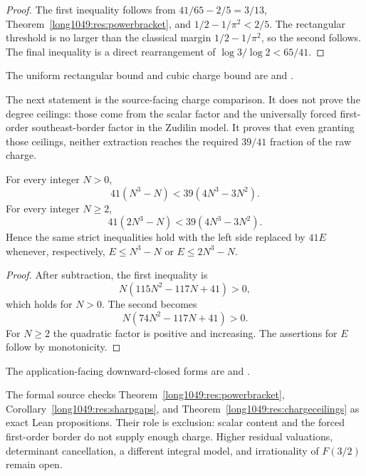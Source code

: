 \begin{proof}
The first inequality follows from
$41/65-2/5=3/13$, Theorem~\ref{long1049:res:powerbracket}, and
$1/2-1/\pi^2<2/5$.  The rectangular threshold is no larger than the classical
margin $1/2-1/\pi^2$, so the second follows.  The final inequality is a direct
rearrangement of $\log3/\log2<65/41$.
\end{proof}

\noindent The uniform rectangular bound and cubic charge bound are
and
.

The next statement is the source-facing charge comparison.  It does not prove
the degree ceilings: those come from the scalar factor and the universally
forced first-order southeast-border factor in the Zudilin model.  It proves
that even granting those ceilings, neither extraction reaches the required
$39/41$ fraction of the raw charge.

\begin{theorem}\label{long1049:res:chargeceilings}
For every integer $N>0$,
\[
 41(N^3-N)<39(4N^3-3N^2).
\]
For every integer $N\ge2$,
\[
 41(2N^3-N)<39(4N^3-3N^2).
\]
Hence the same strict inequalities hold with the left side replaced by
$41E$ whenever, respectively, $E\le N^3-N$ or $E\le2N^3-N$.
\end{theorem}

\begin{proof}
After subtraction, the first inequality is
\[
 N(115N^2-117N+41)>0,
\]
which holds for $N>0$.  The second becomes
\[
 N(74N^2-117N+41)>0.
\]
For $N\ge2$ the quadratic factor is positive and increasing.  The assertions
for $E$ follow by monotonicity.
\end{proof}

\noindent The application-facing downward-closed forms are
and
.

The formal source checks Theorem~\ref{long1049:res:powerbracket},
Corollary~\ref{long1049:res:sharpgaps}, and Theorem~\ref{long1049:res:chargeceilings} as exact
Lean propositions.  Their role is exclusion: scalar content and the forced
first-order border do not supply enough charge.  Higher residual valuations,
determinant cancellation, a different integral model, and irrationality of
$F(3/2)$ remain open.

